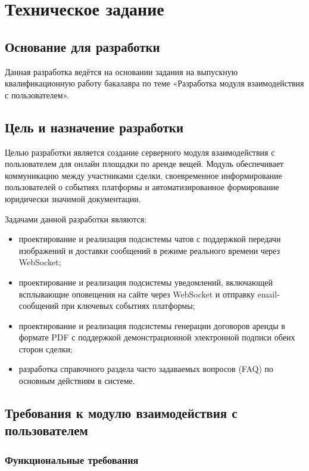 \section{Техническое задание}

\subsection{Основание для разработки}

Данная разработка ведётся на основании задания на выпускную квалификационную работу бакалавра по теме «Разработка модуля взаимодействия с пользователем».

\subsection{Цель и назначение разработки}

Целью разработки является создание серверного модуля взаимодействия с пользователем для онлайн площадки по аренде вещей. Модуль обеспечивает коммуникацию между участниками сделки, своевременное информирование пользователей о событиях платформы и автоматизированное формирование юридически значимой документации.

Задачами данной разработки являются:
\begin{itemize}
    \item проектирование и реализация подсистемы чатов с поддержкой передачи изображений и доставки сообщений в режиме реального времени через WebSocket;
    \item проектирование и реализация подсистемы уведомлений, включающей всплывающие оповещения на сайте через WebSocket и отправку email-сообщений при ключевых событиях платформы;
    \item проектирование и реализация подсистемы генерации договоров аренды в формате PDF с поддержкой демонстрационной электронной подписи обеих сторон сделки;
    \item разработка справочного раздела часто задаваемых вопросов (FAQ) по основным действиям в системе.
\end{itemize}

\subsection{Требования к модулю взаимодействия с пользователем}

\subsubsection{Функциональные требования}

